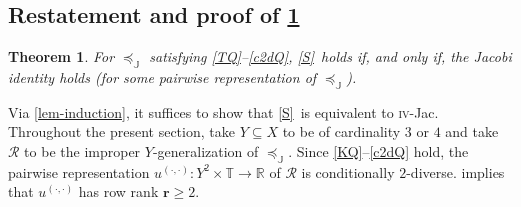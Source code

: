 \documentclass[ecta,nameyear,draft]{econsocart}
\newcommand{\R}{\mathbb R}
\newcommand{\mc}{\mathcal}
\newcommand{\ext}{\mathrel{\mc R}}
\newcommand{\mbbt}{{\mathds {T}}}
\newcommand{\mbbj}{\mathds J}
\newcommand{\dd}{{(\cdot,\cdot)}}
\newcommand{\stability}{\ref{S}}
\newcommand{\fourjac}{\textup{\textsc{iv}-Jac}}
\theoremstyle{plain}
\newtheorem{theorem}{Theorem}%
\theoremstyle{remark}
\begin{document}
\begin{appendix}
  \section{Restatement and proof of \cref{thm-foureq}}\label{sec-proof-foureq}
  \setcounter{theorem}{2}
  \begin{theorem}\label{thm-foureq} For $\preceq_{\mbbj}$ satisfying
    \ref{TQ}--\ref{c2dQ}, \stability\ holds if, and only if, the Jacobi
    identity holds (for some pairwise representation of $\preceq_{\mbbj}$).
  \end{theorem}
  Via \cref{lem-induction}, it suffices to show that \stability\ is equivalent
  to \fourjac. Throughout the present section, take $Y\subseteq X$ to be of
  cardinality $3$ or $4$ and take $\ext$ to be the improper
  $Y$-generalization of $\preceq_{\mbbj}$. Since
  \ref{KQ}--\ref{c2dQ} hold, the pairwise representation $u^{\dd}: Y^{2}\times
  \mbbt \rightarrow \R$ of $\ext$ is conditionally $2$-diverse. 
   implies that $u^{\dd}$ has row rank $\mathbf r \geq 2$.


\end{appendix}
\end{document}
